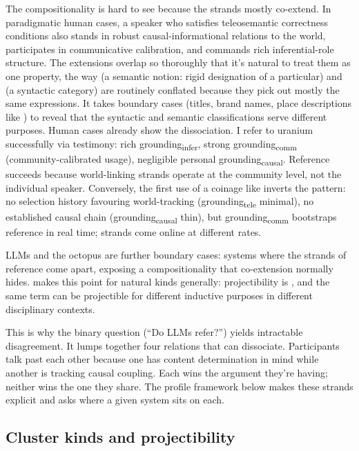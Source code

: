 \documentclass[12pt]{article}
\newcommand{\gtele}{grounding\textsubscript{tele}}
\newcommand{\gcausal}{grounding\textsubscript{causal}}
\newcommand{\gcomm}{grounding\textsubscript{comm}}
\newcommand{\ginfer}{grounding\textsubscript{infer}}
\begin{document}
The compositionality is hard to see because the strands mostly co-extend. In paradigmatic human cases, a speaker who satisfies teleosemantic correctness conditions also stands in robust causal-informational relations to the world, participates in communicative calibration, and commands rich inferential-role structure. The extensions overlap so thoroughly that it's natural to treat them as one property, the way  (a semantic notion: rigid designation of a particular) and  (a syntactic category) are routinely conflated because they pick out mostly the same expressions. It takes boundary cases (titles, brand names, place descriptions like ) to reveal that the syntactic and semantic classifications serve different purposes. Human cases already show the dissociation. I refer to uranium successfully via testimony: rich \ginfer{}, strong \gcomm{} (community-calibrated usage), negligible personal \gcausal{}. Reference succeeds because world-linking strands operate at the community level, not the individual speaker. Conversely, the first use of a coinage like  inverts the pattern: no selection history favouring world-tracking (\gtele{} minimal), no established causal chain (\gcausal{} thin), but \gcomm{} bootstraps reference in real time; strands come online at different rates.

LLMs and the octopus are further boundary cases: systems where the strands of reference come apart, exposing a compositionality that co-extension normally hides. \textcite[148]{boyd_1999_homeostasis} makes this point for natural kinds generally: projectibility is , and the same term can be projectible for different inductive purposes in different disciplinary contexts.

This is why the binary question (\enquote{Do LLMs refer?}) yields intractable disagreement. It lumps together four relations that can dissociate. Participants talk past each other because one has content determination in mind while another is tracking causal coupling. Each wins the argument they're having; neither wins the one they share. The profile framework below makes these strands explicit and asks where a given system sits on each.

\subsection{Cluster kinds and projectibility}
\label{sec:cluster-mechanisms}
\end{document}
